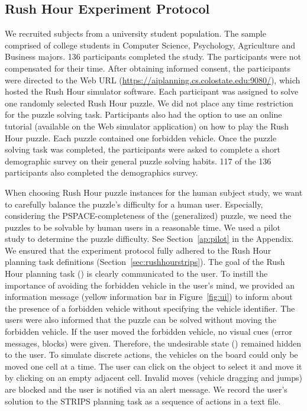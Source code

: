\subsection{Rush Hour Experiment Protocol}
We recruited subjects from a university student population. 
The sample comprised of college students in Computer Science, Psychology, Agriculture and Business majors. 
136 participants completed  the study. 
The participants were not compensated for their time. 
After obtaining informed consent, the participants were directed to the Web URL (\url{https://aiplanning.cs.colostate.edu:9080/}), which hosted the Rush Hour simulator software. 
Each participant was assigned to solve one randomly selected Rush Hour puzzle. 
We did not place any time restriction for the puzzle solving task. Participants also had the option to use an online tutorial (available on the Web simulator application) on how to play the Rush Hour puzzle. 
Each puzzle contained one forbidden vehicle. 
Once the puzzle solving task was completed, the participants were asked to complete a short demographic survey on their general puzzle solving habits. 
117 of the 136 participants also completed the demographics survey. 

When choosing Rush Hour puzzle instances for the human subject study, we want to carefully balance the puzzle’s difficulty for a human user. 
Especially, considering the PSPACE-completeness of the (generalized)
puzzle, we need the puzzles to be solvable by human users in a reasonable time. 
We used a pilot study to determine the puzzle difficulty. 
See Section~\ref{ap:pilot} in the Appendix.
We ensured that the experiment protocol fully adhered to the Rush Hour planning task definitions (Section~\ref{sec:rushhourstrips}). 
The goal of the Rush Hour planning task (\desired) is clearly communicated to the user.
To instill the importance of avoiding the forbidden vehicle in the user’s mind, we provided an information message (yellow information bar in Figure~\ref{fig:ui}) to inform about the presence of a forbidden vehicle without specifying the vehicle identifier.
The users were also informed that the puzzle can be solved without moving the forbidden vehicle. 
If the user moved the forbidden vehicle, no visual cues (error messages, blocks) were given. 
Therefore, the undesirable state (\undesired) remained hidden to the user.
To simulate discrete actions, the vehicles on the board could only be moved one cell at a time. 
The user can click on the object to select it and move it by clicking on an empty adjacent cell. 
Invalid moves (vehicle dragging and jumps) are blocked and the user is notified via an alert message. 
We record the user's solution to the STRIPS planning task as a sequence of actions in a text file.

